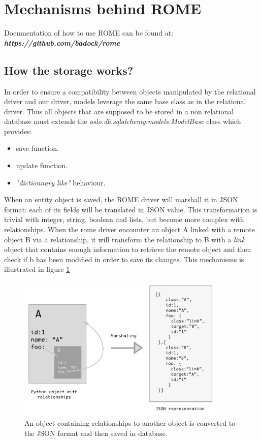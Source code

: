 \section{Mechanisms behind ROME}

Documentation of how to use ROME can be found at:
\textbf{\emph{https://github.com/badock/rome}}

\subsection{How the storage works?}

In order to ensure a compatibility between objects manipulated by the relational
driver and our driver, models leverage the same base class as in the relational
driver. Thus all objects that are supposed to be stored in a non relational
database must extends the \emph{oslo.db.sqlalchemy.models.ModelBase} class which
provides:

\begin{itemize}
\item save function.
\item update function.
\item \emph{"dictionnary like"} behaviour.
\end{itemize}

When an entity object is saved, the ROME driver will marshall it in JSON format:
each of its fields will be translated in JSON value. This transformation is
trivial with integer, string, boolean and lists, but become more complex with
relationships. When the rome driver encounter an object A linked with a remote
object B via a relationship, it will transform the relationship to B with a
\emph{link} object that contains enough information to retrieve the remote
object and then check if b has been modified in order to save its changes. This
mechanisms is illustrated in figure \ref{fig:rome_marshalling}

\begin{figure}[h!]
        \centering
        \includegraphics[width=10cm]{figures/rome_marshaling.pdf}
        \caption{An object containing relationships to another object is
        converted to the JSON format and then saved in database.}
      \label{fig:rome_marshalling}
\vspace*{-.3cm}
\end{figure}


